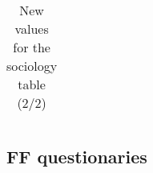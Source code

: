 \begin{table}[H]
\begin{tabular}{l | l | l}
        \end{tabular}

    \caption{New values for the sociology table (2/2)}

\end{table}

\subsection{FF questionaries}

\label{annex:questionaries}
%

%

